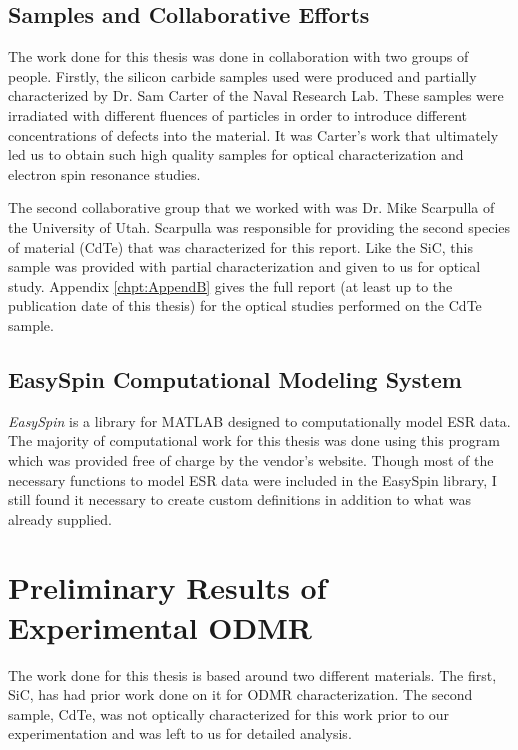 \documentclass[oneside, astronomy, noacknowlegments]{BYUPhys}
\begin{document}
\subsection{Samples and Collaborative Efforts}

The work done for this thesis was done in collaboration with two groups of people. Firstly, the silicon carbide samples used were produced and partially characterized by Dr. Sam Carter of the Naval Research Lab. These samples were irradiated with different fluences of particles in order to introduce different concentrations of defects into the material. It was Carter's work that ultimately led us to obtain such high quality samples for optical characterization and electron spin resonance studies.

The second collaborative group that we worked with was Dr. Mike Scarpulla of the University of Utah. Scarpulla was responsible for providing the second species of material (CdTe) that was characterized for this report. Like the SiC, this sample was provided with partial characterization and given to us for optical study. Appendix \ref{chpt:AppendB} gives the full report (at least up to the publication date of this thesis) for the optical studies performed on the CdTe sample.

\subsection{EasySpin Computational Modeling System}

\textit{EasySpin} is a library for MATLAB designed to computationally model ESR data. The majority of computational work for this thesis was done using this program which was provided free of charge by the vendor's website. Though most of the necessary functions to model ESR data were included in the EasySpin library, I still found it necessary to create custom definitions in addition to what was already supplied.

\section{Preliminary Results of Experimental ODMR}

The work done for this thesis is based around two different materials. The first, SiC, has had prior work done on it for ODMR characterization. The second sample, CdTe, was not optically characterized for this work prior to our experimentation and was left to us for detailed analysis.
\end{document}
